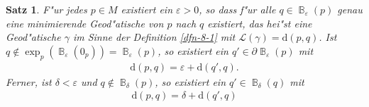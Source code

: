 \documentclass[paper=A4, twoside, chapterprefix=true, bibliography=totoc, headsepline]{scrbook}
\let\temp\phi
\let\phi\varphi
\let\varphi\temp
\let\temp\theta
\let\theta\vartheta
\let\vartheta\temp
\let\temp\epsilon
\let\epsilon\varepsilon
\let\varepsilon\temp
\let\temp\rho
\let\rho\varrho
\let\varrho\temp
\DeclareMathOperator{\B}{\mathbb{B}} %
\newcommand{\dop}{\mathrm{d}}
\theoremstyle{plain}
\newtheorem{Satz}[Dfn]{Satz}
\theoremstyle{nonumberplain}
\theoremstyle{empty}
\theoremstyle{break}
\begin{document}
\begin{Satz}\label{satz-8-7}
  F"ur jedes $p \in M$ existiert ein $\epsilon > 0$, so dass f"ur alle $q \in \B_{\epsilon}(p)$ genau eine minimierende Geod"atische von $p$ nach $q$ existiert, das hei"st eine Geod"atische $\gamma$ im Sinne der Definition \ref{dfn-8-1} mit $\mathcal L(\gamma) = \dop(p,q)$.
  Ist $q \notin \exp_p(\B_{\epsilon}(0_p)) = \B_{\epsilon}(p)$, so existiert ein $q' \in \partial \B_{\epsilon}(p)$ mit
  \begin{align*}
    \dop(p,q) = \epsilon + \dop(q',q).
  \end{align*}
  Ferner, ist $\delta < \epsilon$ und $q \notin \B_\delta(p)$, so existiert ein $q' \in \B_\delta(q)$ mit
  \begin{align*}
    \dop(p,q) = \delta + \dop(q',q)
  \end{align*}
  \begin{center}\end{center}
\end{Satz}
\end{document}
